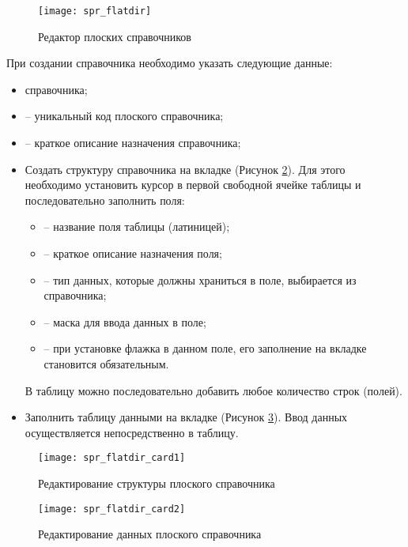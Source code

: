 \begin{figure}[!ht]\centering
 \texttt{[image: spr\_flatdir]}
 \caption{Редактор плоских справочников}
 \label{img_spr_flatdir}
\end{figure} 

При создании справочника необходимо указать следующие данные:
\begin{itemize}
 \item {} справочника;
 \item {} -- уникальный код плоского справочника;
 \item {} -- краткое описание назначения справочника;
 \item Создать структуру справочника на вкладке  (Рисунок \ref{img_spr_flatdir_card1}). Для этого необходимо установить курсор в первой свободной ячейке таблицы и последовательно заполнить поля:
  \begin{itemize}
   \item {} -- название поля таблицы (латиницей);
   \item {} -- краткое описание назначения поля;
   \item {} -- тип данных, которые должны храниться в поле, выбирается из справочника;
   \item {} -- маска для ввода данных в поле;
   \item {} -- при установке флажка в данном поле, его заполнение на вкладке  становится обязательным.
  \end{itemize}
 В таблицу можно последовательно добавить любое количество строк (полей).
 \item Заполнить таблицу данными на вкладке  (Рисунок \ref{img_spr_flatdir_card2}). Ввод данных осуществляется непосредственно в таблицу.
\end{itemize}

\begin{figure}[!ht]\centering
 \texttt{[image: spr\_flatdir\_card1]}
 \caption{Редактирование структуры плоского справочника}
 \label{img_spr_flatdir_card1}
\end{figure} 

\begin{figure}[!ht]\centering
 \texttt{[image: spr\_flatdir\_card2]}
 \caption{Редактирование данных плоского справочника}
 \label{img_spr_flatdir_card2}
\end{figure} 

